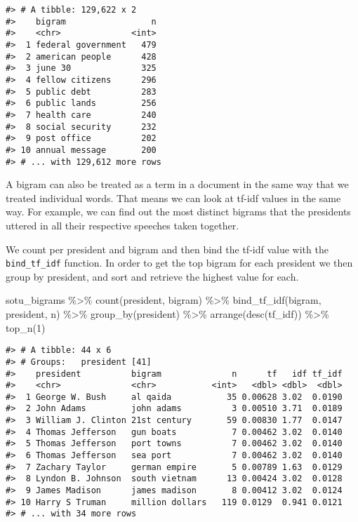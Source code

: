 \documentclass[
]{book}
\newenvironment{Shaded}{\begin{snugshade}}{\end{snugshade}}
\newcommand{\DecValTok}[1]{\textcolor[rgb]{0.00,0.00,0.81}{#1}}
\newcommand{\FunctionTok}[1]{\textcolor[rgb]{0.00,0.00,0.00}{#1}}
\newcommand{\NormalTok}[1]{#1}
\newcommand{\SpecialCharTok}[1]{\textcolor[rgb]{0.00,0.00,0.00}{#1}}
\begin{document}
\begin{verbatim}
#> # A tibble: 129,622 x 2
#>    bigram                 n
#>    <chr>              <int>
#>  1 federal government   479
#>  2 american people      428
#>  3 june 30              325
#>  4 fellow citizens      296
#>  5 public debt          283
#>  6 public lands         256
#>  7 health care          240
#>  8 social security      232
#>  9 post office          202
#> 10 annual message       200
#> # ... with 129,612 more rows
\end{verbatim}

A bigram can also be treated as a term in a document in the same way that we treated individual words. That means we can look at tf-idf values in the same way. For example, we can find out the most distinct bigrams that the presidents uttered in all their respective speeches taken together.

We count per president and bigram and then bind the tf-idf value with the \texttt{bind\_tf\_idf} function. In order to get the top bigram for each president we then group by president, and sort and retrieve the highest value for each.

\begin{Shaded}
\begin{Highlighting}[]
\NormalTok{sotu\_bigrams }\SpecialCharTok{\%\textgreater{}\%}
  \FunctionTok{count}\NormalTok{(president, bigram) }\SpecialCharTok{\%\textgreater{}\%}
  \FunctionTok{bind\_tf\_idf}\NormalTok{(bigram, president, n) }\SpecialCharTok{\%\textgreater{}\%}
  \FunctionTok{group\_by}\NormalTok{(president) }\SpecialCharTok{\%\textgreater{}\%}  
  \FunctionTok{arrange}\NormalTok{(}\FunctionTok{desc}\NormalTok{(tf\_idf)) }\SpecialCharTok{\%\textgreater{}\%} 
  \FunctionTok{top\_n}\NormalTok{(}\DecValTok{1}\NormalTok{)}
\end{Highlighting}
\end{Shaded}

\begin{verbatim}
#> # A tibble: 44 x 6
#> # Groups:   president [41]
#>    president          bigram              n      tf   idf tf_idf
#>    <chr>              <chr>           <int>   <dbl> <dbl>  <dbl>
#>  1 George W. Bush     al qaida           35 0.00628 3.02  0.0190
#>  2 John Adams         john adams          3 0.00510 3.71  0.0189
#>  3 William J. Clinton 21st century       59 0.00830 1.77  0.0147
#>  4 Thomas Jefferson   gun boats           7 0.00462 3.02  0.0140
#>  5 Thomas Jefferson   port towns          7 0.00462 3.02  0.0140
#>  6 Thomas Jefferson   sea port            7 0.00462 3.02  0.0140
#>  7 Zachary Taylor     german empire       5 0.00789 1.63  0.0129
#>  8 Lyndon B. Johnson  south vietnam      13 0.00424 3.02  0.0128
#>  9 James Madison      james madison       8 0.00412 3.02  0.0124
#> 10 Harry S Truman     million dollars   119 0.0129  0.941 0.0121
#> # ... with 34 more rows
\end{verbatim}
\end{document}
